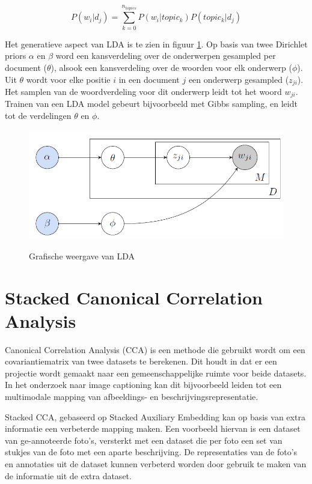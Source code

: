 \begin{equation}
    \label{formule:lda}
    P(w_i | d_j) = \sum\limits_{k=0}^{n_{topics}}P(w_i|topic_k)P(topic_k|d_j)
\end{equation}

Het generatieve aspect van LDA is te zien in figuur \ref{fig:lda}. Op basis van twee Dirichlet priors $\alpha$ en $\beta$ word een kansverdeling over de onderwerpen gesampled per document ($\theta$), alsook een kansverdeling over de woorden voor elk onderwerp ($\phi$). Uit $\theta$ wordt voor elke positie $i$ in een document $j$ een onderwerp gesampled ($z_{ji}$). Het samplen van de woordverdeling voor dit onderwerp leidt tot het woord $w_{ji}$. Trainen van een LDA model gebeurt bijvoorbeeld met Gibbs sampling, en leidt tot de verdelingen $\theta$ en $\phi$.

\begin{figure}[tb]
    \centering
    \includegraphics[width=\linewidth]{Images/lda.png}
    \label{fig:lda}
    \caption{Grafische weergave van LDA}
\end{figure}


\section{Stacked Canonical Correlation Analysis}
Canonical Correlation Analysis (CCA) is een methode die gebruikt wordt om een covariantiematrix van twee datasets te berekenen. Dit houdt in dat er een projectie wordt gemaakt naar een gemeenschappelijke ruimte voor beide datasets. In het onderzoek naar image captioning kan dit bijvoorbeeld leiden tot een multimodale mapping van afbeeldings- en beschrijvingsrepresentatie. 

Stacked CCA, gebaseerd op Stacked Auxiliary Embedding kan op basis van extra informatie een verbeterde mapping maken. Een voorbeeld hiervan is een dataset van ge-annoteerde foto's, versterkt met een dataset die per foto een set van stukjes van de foto met een aparte beschrijving. De representaties van de foto's en annotaties uit de dataset kunnen verbeterd worden door gebruik te maken van de informatie uit de extra dataset.

